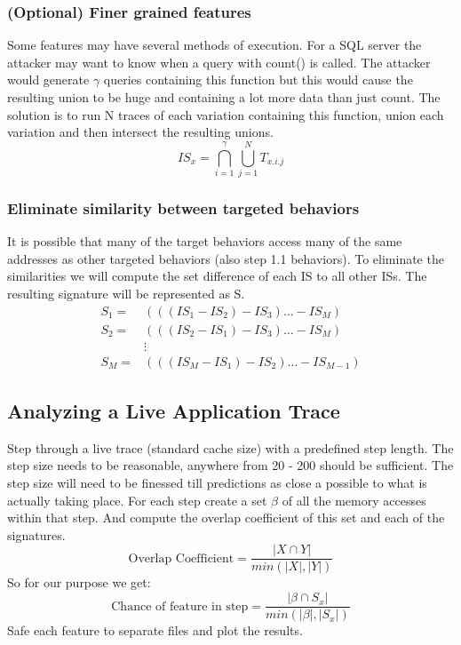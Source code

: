\documentclass[11pt, oneside]{article}
\begin{document}
\subsubsection{(Optional) Finer grained features}
Some features may have several methods of execution. For a SQL server the 
attacker may want to know when a query with count() is called. The attacker 
would generate $\gamma$ queries containing this function but this would cause 
the resulting union to be huge and containing a lot more data than just count. 
The solution is to run N traces of each variation containing this function, 
union each variation and then intersect the resulting unions. \\
$$IS_x = \bigcap_{i=1}^{\gamma}\bigcup_{j=1}^{N}T_{x.i.j}$$

\subsubsection{Eliminate similarity between targeted behaviors}
It is possible that many of the target behaviors access many of the same 
addresses as other targeted behaviors (also step 1.1 behaviors). To eliminate 
the similarities we will compute the set difference of each IS to all other 
ISs. The resulting signature will be represented as S. \\
\begin{align*}
S_1 =& (((IS_1 - IS_2) - IS_3)\ldots - IS_M) \\
S_2 =& (((IS_2 - IS_1) - IS_3)\ldots - IS_M) \\
    &\vdots \\
S_M =& (((IS_M - IS_1) - IS_2)\ldots - IS_{M-1})
\end{align*}

\subsection{Analyzing a Live Application Trace}
Step through a live trace (standard cache size) with a predefined step length. 
The step size needs to be reasonable, anywhere from 20 - 200 should be 
sufficient. The step size will need to be finessed till predictions as close a 
possible to what is actually taking place. For each step create a set $\beta$ 
of all the memory accesses within that step. And compute the overlap 
coefficient of this set and each of the signatures.
$$\text{Overlap Coefficient} = \frac{|X\cap Y|}{min(|X|,|Y|)}$$
So for our purpose we get:
$$\text{Chance of feature in step} = 
    \frac{|\beta\cap S_x|}{min(|\beta|, |S_x|)}$$
Safe each feature to separate files and plot the results.
\end{document}
